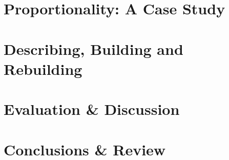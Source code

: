 \documentclass[10pt,oneside,a4paper,onecolumn,titlepage,draft]{lancsthesis}
\begin{document}
\chapter{Proportionality: A Case Study}
\label{sec:personal}


\chapter{Describing, Building and Rebuilding}
\label{sec:rebuilding}


\chapter{Evaluation \& Discussion}
\label{sec:evaluation}


\chapter{Conclusions \& Review}
\label{sec:conclusions}



\backmatter%
\pagebreak%
%



\pagebreak
\appendix
{}







\end{document}
